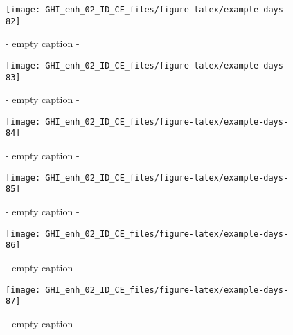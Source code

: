 \documentclass[
  10pt,
  a4paper,oneside]{article}
\begin{document}
\begin{figure}[H]

{\centering \texttt{[image: GHI\_enh\_02\_ID\_CE\_files/figure-latex/example-days-82]} 

}

\caption{ - empty caption - }\label{fig:example-days-82}
\end{figure}

\begin{figure}[H]

{\centering \texttt{[image: GHI\_enh\_02\_ID\_CE\_files/figure-latex/example-days-83]} 

}

\caption{ - empty caption - }\label{fig:example-days-83}
\end{figure}

\begin{figure}[H]

{\centering \texttt{[image: GHI\_enh\_02\_ID\_CE\_files/figure-latex/example-days-84]} 

}

\caption{ - empty caption - }\label{fig:example-days-84}
\end{figure}

\begin{figure}[H]

{\centering \texttt{[image: GHI\_enh\_02\_ID\_CE\_files/figure-latex/example-days-85]} 

}

\caption{ - empty caption - }\label{fig:example-days-85}
\end{figure}

\begin{figure}[H]

{\centering \texttt{[image: GHI\_enh\_02\_ID\_CE\_files/figure-latex/example-days-86]} 

}

\caption{ - empty caption - }\label{fig:example-days-86}
\end{figure}

\begin{figure}[H]

{\centering \texttt{[image: GHI\_enh\_02\_ID\_CE\_files/figure-latex/example-days-87]} 

}

\caption{ - empty caption - }\label{fig:example-days-87}
\end{figure}
\end{document}

